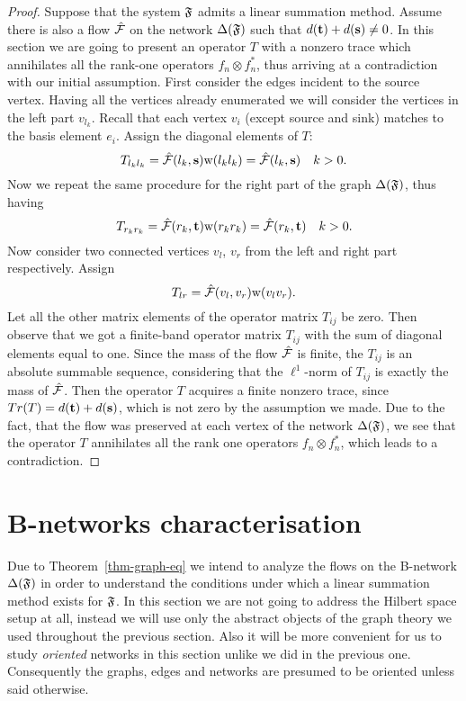 \documentclass[12pt]{amsart}
\begin{document}
\begin{proof}
      Suppose that the system $\mathfrak{F}$ admits a linear summation method.
      Assume there is also a flow $\mathcal{\hat{F}}$ on the network $\Delta(\mathfrak{F})$ such that $d(\mathbf{t}) + d(\mathbf{s}) \neq 0$.
      In this section we are going to present an operator $T$ with a nonzero trace which annihilates all the rank-one
      operators $f_n \otimes f^*_n$, thus arriving at a contradiction with our initial assumption.
      First consider the edges incident to the source vertex.
      Having all the vertices already enumerated we will consider the vertices in the left part $v_{l_k}$.
      Recall that each vertex $v_i$ (except source and sink) matches to the basis element $e_i$.
      Assign the diagonal elements of $T$:
      \[
        T_{l_k l_k} = \mathcal{\hat{F}}(l_k, \mathbf{s}) \mathrm{w}(l_k l_k) = \mathcal{\hat{F}}(l_k, \mathbf{s}) \quad k > 0.
      \]
      Now we repeat the same procedure for the right part of the graph $\Delta(\mathfrak{F})$, thus having
      \[
        T_{r_k r_k} = \mathcal{\hat{F}}(r_k, \mathbf{t}) \mathrm{w}(r_k r_k) = \mathcal{\hat{F}}(r_k, \mathbf{t}) \quad k > 0.
      \]
      Now consider two connected vertices $v_l$, $v_r$ from the left and right part
        respectively. Assign
      \[
        T_{lr} = \mathcal{\hat{F}}(v_l, v_r) \mathrm{w}(v_l  v_r).
      \]
      Let all the other matrix elements of the operator matrix $T_{ij}$ be zero.
      Then observe that we got a finite-band operator matrix $T_{ij}$ with the sum of diagonal elements
      equal to one.
      Since the mass of the flow $\mathcal{\hat{F}}$ is finite, the $T_{ij}$ is an absolute summable sequence, considering that
        the $\ell^1$-norm of $T_{ij}$ is exactly the mass of $\mathcal{\hat{F}}$.
      Then the operator $T$ acquires a finite nonzero trace, since $Tr(T) = d(\mathbf{t}) + d(\mathbf{s})$, which is not zero
        by the assumption we made.
      Due to the fact, that the flow was preserved at each vertex of the network $\Delta(\mathfrak{F})$,
        we see that the operator $T$ annihilates all the rank one operators $f_n \otimes f^*_n$,
        which leads to a contradiction.
    \end{proof}

  \section{B-networks characterisation}
    Due to Theorem~\ref{thm-graph-eq} we intend to analyze the flows on the B-network
      $\Delta(\mathfrak{F})$ in order to understand the conditions under which a linear
      summation method exists for $\mathfrak{F}$.
    In this section we are not going to address the Hilbert space setup at all,
      instead we will use only the abstract objects of the graph theory
      we used throughout the previous section.
    Also it will be more convenient for us to study \emph{oriented} networks in this section unlike we
      did in the previous one.
    Consequently the graphs, edges and networks are presumed to be oriented unless said otherwise.
\end{document}
